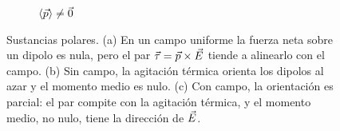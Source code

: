 \begin{figure}[t]
\begin{subfigure}[b]{0.29\textwidth}
\caption{$\langle\vec p\rangle\neq\vec 0$}
\end{subfigure}
\caption{Sustancias polares. (a) En un campo uniforme la fuerza neta sobre un dipolo es nula, pero
el par $\vec\tau=\vec p\times\vec E$ tiende a alinearlo con el campo. (b) Sin campo, la agitación térmica
orienta los dipolos al azar y el momento medio es nulo. (c) Con campo, la orientación es parcial:
el par compite con la agitación térmica, y el momento medio, no nulo, tiene la dirección de $\vec E$.}
\label{fig:orientacion}
\end{figure}
